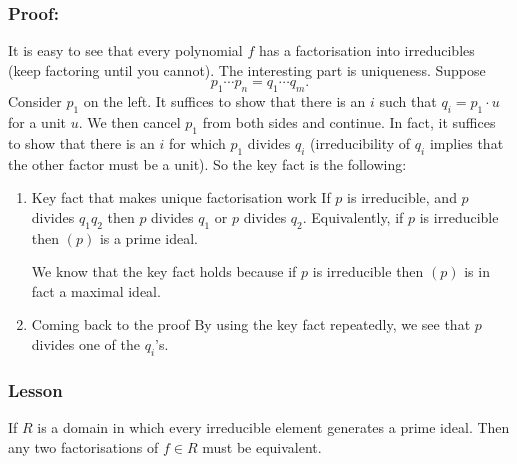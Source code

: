 \documentclass[11pt]{article}
\begin{document}
\subsubsection{Proof:}
\label{sec:org5e4205a}
It is easy to see that every polynomial \(f\) has a factorisation into irreducibles (keep factoring until you cannot).  The interesting part is uniqueness.
Suppose
\[ p_1 \cdots p_{n} = q_{1} \cdots q_{m}.\]
Consider \(p_{1}\) on the left.
It suffices to show that there is an \(i\) such that \(q_{i} = p_{1} \cdot u\) for a unit \(u\).
We then cancel \(p_1\) from both sides and continue.
In fact, it suffices to show that there is an \(i\) for which \(p_{1}\) divides \(q_i\) (irreducibility of \(q_i\) implies that the other factor must be a unit).
So the key fact is the following:
\begin{enumerate}
\item Key fact that makes unique factorisation work
\label{sec:org57d54f2}
If \(p\) is irreducible, and \(p\) divides \(q_1q_2\) then \(p\) divides \(q_1\) or \(p\) divides \(q_2\).
Equivalently, if \(p\) is irreducible then \((p)\) is a prime ideal.

We know that the key fact holds because if \(p\) is irreducible then \((p)\) is in fact a maximal ideal.
\item Coming back to the proof
\label{sec:orgadd9ff6}
By using the key fact repeatedly, we see that \(p\) divides one of the \(q_{i}\)'s.
\end{enumerate}
\subsubsection{Lesson}
\label{sec:org69c9193}
If \(R\) is a domain in which every irreducible element generates a prime ideal.
Then any two factorisations of \(f \in R\) must be equivalent.
\end{document}
